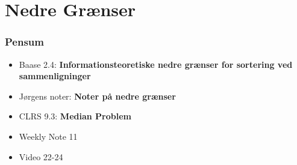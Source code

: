 \section{Nedre Grænser}%
\label{sec:nedregrænser}

\begin{frame}
  \frametitle{Pensum}
  \begin{itemize}
    \item Baase 2.4: \textbf{Informationsteoretiske nedre grænser for sortering ved sammenligninger}
    \item Jørgens noter: \textbf{Noter på nedre grænser}
    \item CLRS 9.3: \textbf{Median Problem}
    \item Weekly Note 11
    \item Video 22-24
  \end{itemize}
\end{frame}

